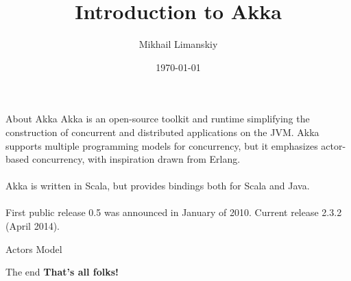 \documentclass{beamer}
\title{Introduction to Akka}
\author{Mikhail Limanskiy}
\institute{SymphonyTeleca}
\date{\today}
\begin{document}
\begin{frame}
    \titlepage
\end{frame}

\begin{frame}{About Akka}
Akka is an open-source toolkit and runtime simplifying the construction of concurrent
and distributed applications on the JVM. Akka supports multiple programming models
for concurrency, but it emphasizes actor-based concurrency, with inspiration drawn from Erlang.\\~\\

Akka is written in Scala, but provides bindings both for Scala and Java.\\~\\

First public release 0.5 was announced in January of 2010. Current release 2.3.2 (April 2014).
\end{frame}

\begin{frame}{Actors Model}
\end{frame}

\begin{frame}{The end}
\centering
\textbf{That's all folks!}
\end{frame}
\end{document}
